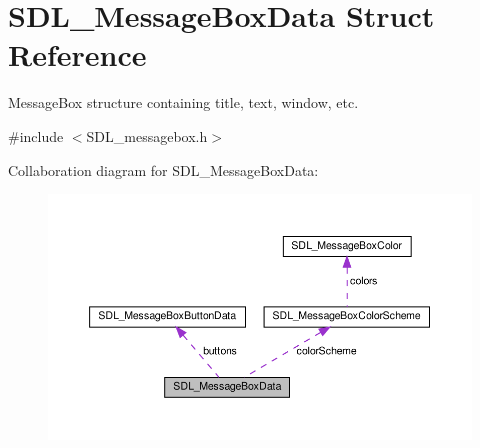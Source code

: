 \hypertarget{structSDL__MessageBoxData}{}\section{S\+D\+L\+\_\+\+Message\+Box\+Data Struct Reference}
\label{structSDL__MessageBoxData}


Message\+Box structure containing title, text, window, etc.  




{\ttfamily \#include $<$S\+D\+L\+\_\+messagebox.\+h$>$}



Collaboration diagram for S\+D\+L\+\_\+\+Message\+Box\+Data\+:\nopagebreak
\begin{figure}[H]
\begin{center}
\leavevmode
\includegraphics[width=350pt]{structSDL__MessageBoxData__coll__graph}
\end{center}
\end{figure}
